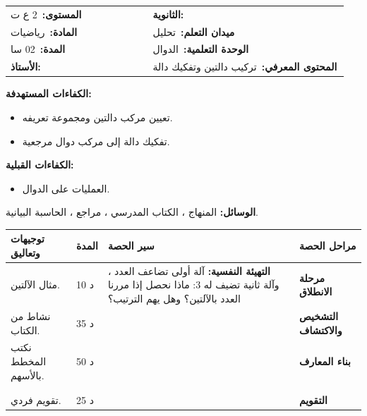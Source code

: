 \documentclass[12pt,a4paper]{article}
\makeatletter
\newenvironment{LTR}{\begin{otherlanguage}{english}}{\end{otherlanguage}}
\newcommand{\ar}[1]{\foreignlanguage{arabic}{#1}}
\newcommand{\Phase}[1]{\textbf{#1}}
\newcommand{\Fld}[2]{\textbf{#1:}\ #2}
\newcommand{\ModhHead}[9]{%
\begin{LTR}
\begin{tcolorbox}[enhanced,colback=white,colframe=cThm!85!black,arc=4mm,boxrule=1pt,top=14pt,bottom=6pt,left=8pt,right=8pt,
 overlay={\node[fill=cThm!85!black,text=white,rounded corners=3mm,inner xsep=14pt,inner ysep=4pt,font=\large\bfseries] at ([yshift=0pt]frame.north){\ar{مذكرة رقم #1}};},
 before upper={\selectlanguage{arabic}}]
\begin{tabular}{@{}p{0.4\linewidth}p{0.55\linewidth}@{}}
\Fld{المستوى}{#2} & \Fld{الثانوية}{\dotfill}\\[3pt]
\Fld{المادة}{رياضيات} & \Fld{ميدان التعلم}{#3}\\[3pt]
\Fld{المدة}{#5} & \Fld{الوحدة التعلمية}{#4}\\[3pt]
\Fld{الأستاذ}{\dotfill} & \Fld{المحتوى المعرفي}{#6}\\
\end{tabular}
\end{tcolorbox}
\begin{tcolorbox}[enhanced,colback=white,colframe=cThm!85!black,arc=3mm,boxrule=0.8pt,sidebyside,sidebyside align=top,lefthand ratio=0.5,
 segmentation style={dashed,cThm!60},before upper={\selectlanguage{arabic}},before lower={\selectlanguage{arabic}}]
\textbf{الكفاءات المستهدفة:}\par #8
\tcblower
\textbf{الكفاءات القبلية:}\par #7
\end{tcolorbox}
\end{LTR}
\par\smallskip\textbf{الوسائل:} #9\par\smallskip}
\newenvironment{Sayr}{%
\begin{LTR}\renewcommand{\arraystretch}{1.25}
\begin{longtable}{|p{0.17\textwidth}|>{\centering\arraybackslash}p{0.06\textwidth}|p{0.53\textwidth}|>{\centering\arraybackslash}p{0.12\textwidth}|}
\hline\rowcolor{cThm!12}\ar{\textbf{توجيهات وتعاليق}} & \ar{\textbf{المدة}} & \ar{\textbf{سير الحصة}} & \ar{\textbf{مراحل الحصة}}\\\hline\endhead
\hline\endfoot}{\end{longtable}\end{LTR}}
\newcommand{\Row}[4]{\ar{\small #4} & \ar{#3} & \ar{#2} & \cellcolor{cThm!8}\ar{\Phase{#1}}\\\hline}
\newcommand{\Lab}[2]{\foreignlanguage{english}{\tcbox[on line,colback=#1,colframe=#1,boxrule=0pt,arc=2pt,boxsep=1pt,left=5pt,right=5pt,top=1pt,bottom=1pt]{\ar{\textcolor{white}{\textbf{#2}}}}}}
\newcommand{\ck}{\ensuremath{{\color{cRem}\checkmark}}}
\makeatother
\begin{document}
\newpage
\ModhHead{03}{2 ع ت}{تحليل}{الدوال}{02 سا}{تركيب دالتين وتفكيك دالة}%
{\begin{itemize}\item العمليات على الدوال.\end{itemize}}%
{\begin{itemize}\item تعيين مركب دالتين ومجموعة تعريفه.\item تفكيك دالة إلى مركب دوال مرجعية.\end{itemize}}%
{المنهاج ، الكتاب المدرسي ، مراجع ، الحاسبة البيانية.}
\begin{Sayr}
\Row{مرحلة الانطلاق}{%
\textbf{التهيئة النفسية:} آلة أولى تضاعف العدد ، وآلة ثانية تضيف له $3$: ماذا نحصل إذا مررنا العدد بالآلتين؟ وهل يهم الترتيب؟}{10 د}{مثال الآلتين.}
\Row{التشخيص والاكتشاف}{%
\Lab{cEx}{مناقشة نشاط 05 صفحة 9}\par\ck\ $x$ بدلالة الزمن $t$ ، والمسافة بدلالة $x$: المرور من $t$ إلى المسافة يتم بإتباع المخطط $t\mapsto x\mapsto d$.\par
\ck\ نسمي الدالة الناتجة \textbf{مركب دالتين}.\par
}{35 د}{نشاط من الكتاب.}
\Row{بناء المعارف}{%
\Lab{cDef}{تعريف}\ $(g\circ f)(x)=g\big(f(x)\big)$ ، وهي معرفة إذا كان $x\in D_f$ و $f(x)\in D_g$.\par\Lab{cEx}{مثال}\ $f(x)=x-3$ و $g(x)=\sqrt x$:\par\ck\ $(g\circ f)(x)=\sqrt{x-3}$ معرفة على $[3;+\infty[$.\par
\ck\ $(f\circ g)(x)=\sqrt x-3$ معرفة على $[0;+\infty[$.\par
}{50 د}{نكتب المخطط بالأسهم.}
\Row{}{%
\Lab{cThm!80!black}{حذار}\ عموماً $g\circ f\neq f\circ g$.\par\Lab{cMeth}{تفكيك دالة}\ نبحث عن العمليات المتتالية التي نطبقها على $x$.\par}{}{}
\Row{}{%
\Lab{cEx}{مثال}\par\ck\ $h(x)=(2x-1)^2$: $x\overset{u}{\longmapsto}2x-1\overset{v}{\longmapsto}(2x-1)^2$ ، إذن $h=v\circ u$ مع $u(x)=2x-1$ و $v(x)=x^2$.\par
\ck\ $k(x)=\dfrac3{x-2}+1$: $x\mapsto x-2\mapsto\dfrac1{x-2}\mapsto\dfrac3{x-2}\mapsto\dfrac3{x-2}+1$.\par
}{}{}
\Row{التقويم}{%
\Lab{cEx}{تطبيق}\par فكّك الدالة $k(x)=\sqrt{x^2+1}$ ، ثم احسب $(f\circ g)(x)$ و $(g\circ f)(x)$ حيث $f(x)=x^2$ و $g(x)=x+1$.\par\textbf{الحل:} $k=v\circ u$ مع $u(x)=x^2+1$ و $v(x)=\sqrt x$ ؛ $(f\circ g)(x)=(x+1)^2$ ، $(g\circ f)(x)=x^2+1$.\par\textbf{واجب منزلي:} تمارين من الكتاب المدرسي.\par\smallskip\textbf{ملاحظات حول سير الحصة:} \dotfill}{25 د}{تقويم فردي.}
\end{Sayr}
\end{document}
